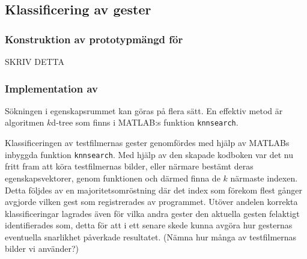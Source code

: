 \documentclass[../rapport_MVEX01-11-05]{subfiles}
\begin{document}
\subsection{Klassificering av gester} 
\subsubsection{Konstruktion av prototypmängd för \knn}
SKRIV DETTA

\subsubsection{Implementation av \knn}
Sökningen i egenskapsrummet kan göras på flera sätt. En effektiv metod är
algoritmen $k$d-tree som finns i MATLAB:s funktion {\tt knnsearch}.

Klassificeringen av testfilmernas gester genomfördes med hjälp av MATLABs
inbyggda funktion \texttt{knnsearch}. Med hjälp av den skapade kodboken var det
nu fritt fram att köra testfilmernas bilder, eller närmare bestämt deras
egenskapsvektorer, genom funktionen och därmed finna de $k$ närmaste indexen.
Detta följdes av en majoritetsomröstning där det index som förekom flest gånger
avgjorde vilken gest som registrerades av programmet. Utöver andelen korrekta
klassificeringar lagrades även för vilka andra gester den aktuella gesten
felaktigt identifierades som, detta för att i ett senare skede kunna avgöra hur
gesternas eventuella snarlikhet påverkade resultatet. (Nämna hur många av
testfilmernas bilder vi använder?)  
\end{document}

